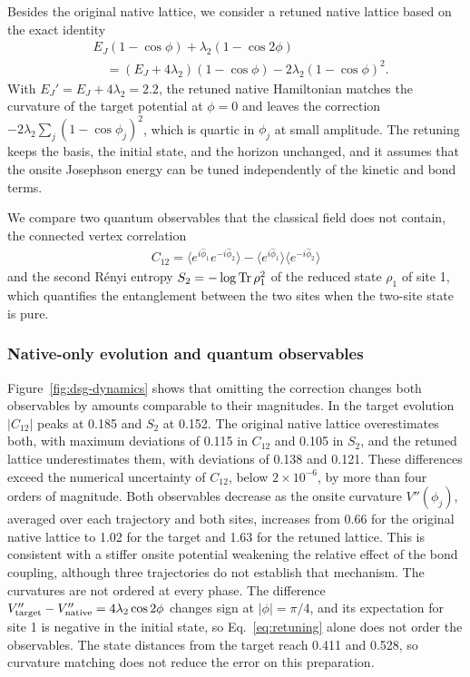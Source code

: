 \documentclass[pra,twocolumn,superscriptaddress,nofootinbib,floatfix]{revtex4-2}
\theoremstyle{remark}
\begin{document}
Besides the original native lattice, we consider a retuned native lattice based on the exact identity
\begin{align}
&E_J(1-\cos\phi)+\lambda_2(1-\cos2\phi)\nonumber\\
&\quad=(E_J+4\lambda_2)(1-\cos\phi)-2\lambda_2(1-\cos\phi)^2 .
\label{eq:retuning}
\end{align}
With \(E_J'=E_J+4\lambda_2=2.2\), the retuned native Hamiltonian matches the curvature of the target potential at \(\phi=0\) and leaves the correction \(-2\lambda_2\sum_j(1-\cos\phi_j)^2\), which is quartic in \(\phi_j\) at small amplitude. The retuning keeps the basis, the initial state, and the horizon unchanged, and it assumes that the onsite Josephson energy can be tuned independently of the kinetic and bond terms.

We compare two quantum observables that the classical field does not contain, the connected vertex correlation
\begin{align}
C_{12}=\langle e^{i\hat\phi_1}e^{-i\hat\phi_2}\rangle-\langle e^{i\hat\phi_1}\rangle\langle e^{-i\hat\phi_2}\rangle
\end{align}
and the second R\'enyi entropy \(S_2=-\log{\rm Tr}\,\rho_1^2\) of the reduced state \(\rho_1\) of site 1, which quantifies the entanglement between the two sites when the two-site state is pure.

\subsubsection{Native-only evolution and quantum observables}

Figure~\ref{fig:dsg-dynamics} shows that omitting the correction changes both observables by amounts comparable to their magnitudes. In the target evolution \(|C_{12}|\) peaks at 0.185 and \(S_2\) at 0.152. The original native lattice overestimates both, with maximum deviations of 0.115 in \(C_{12}\) and 0.105 in \(S_2\), and the retuned lattice underestimates them, with deviations of 0.138 and 0.121. These differences exceed the numerical uncertainty of \(C_{12}\), below \(2\times10^{-6}\), by more than four orders of magnitude. Both observables decrease as the onsite curvature \(V''(\phi_j)\), averaged over each trajectory and both sites, increases from 0.66 for the original native lattice to 1.02 for the target and 1.63 for the retuned lattice. This is consistent with a stiffer onsite potential weakening the relative effect of the bond coupling, although three trajectories do not establish that mechanism. The curvatures are not ordered at every phase. The difference \(V_{\rm target}''-V_{\rm native}''=4\lambda_2\cos2\phi\) changes sign at \(|\phi|=\pi/4\), and its expectation for site 1 is negative in the initial state, so Eq.~\eqref{eq:retuning} alone does not order the observables. The state distances from the target reach 0.411 and 0.528, so curvature matching does not reduce the error on this preparation.
\end{document}
